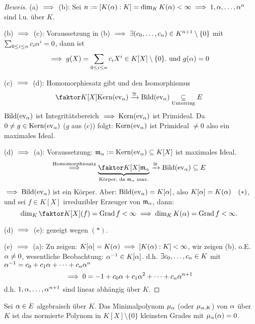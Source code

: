 \documentclass[a4paper]{report}
\begin{document}
\begin{proof}[Beweis]
  \item (a) $\implies$ (b):
  Sei $n := [K (\alpha) : K] = \dim_{K}K(\alpha) < \infty \implies 1, \alpha, \ldots, \alpha^{n}$ sind l.u. über $K$.
  \item (b) $\implies$ (c): Voraussetzung in (b) $\implies \exists(c_{0}, \ldots, c_{n}) \in K^{n+1} \setminus \{0\}$ mit \(\sum_{0 \le i \le n} c_{i}\alpha^{i} = 0\), dann ist
  \[\implies g(X) = \sum_{0 \le i \le n}c_{i}X^{i} \in K[X] \setminus \{0\}. \text{ und } g(\alpha) = 0\]
  \item (c) $\implies$ (d):
  Homomorphiesatz gibt und den Isomorphismus
  \[\fak{K[X]}{\ker(\ev_{\a})} \xrightarrow{\cong}\bil(\ev_{\a}) \underset{\text{Unterring}}\subseteq E\]
  $\operatorname{Bild}(\operatorname{ev}_{\alpha})$ ist Integritätsbereich $\implies \operatorname{Kern}(\operatorname{ev}_{\alpha})$ ist Primideal. Da $0 \ne g \in \operatorname{Kern}(\operatorname{ev}_{\alpha})$ ($g$ aus (c)) folgt: $\operatorname{Kern}(\operatorname{ev}_{\alpha})$ ist Primideal $\ne 0$ also ein maximales Ideal.
  \item (d) $\implies$ (a):
  Voraussetzung: $\mathfrak m_{\alpha}:= \operatorname{Kern}(\operatorname{ev}_\alpha) \subseteq K[X]$ ist maximales Ideal.
  \[\overset{\text{Homomorphiesatz}} \imp \ubr{\fak{K[X]}{\mathfrak m_{\a}}}_{\text{Körper, da }\mathfrak m_{\a} \text{ max.}} \xrightarrow{\cong} \bil(\ev_{\a})\subseteq E\]
  $\implies \operatorname{Bild}(\operatorname{ev}_{\alpha})$ ist ein Körper. Aber: $\operatorname{Bild}(\operatorname{ev}_{\alpha}) = K[\alpha]$, also $K[\alpha] = K(\alpha)\quad (*)$, und sei $f \in K[X]$ irreduzibler Erzeuger von $\mathfrak m_{\alpha}$, dann:
  \[\dim_{K} \fak{K[X]}{(f)} = \grad f < \infty \imp \dim_{K} K(\a) = \grad f < \infty.\]
  \item (d) $\implies$ (e): gezeigt wegen $(*)$.
  \item (e) $\implies$ (a): Zu zeigen: $K[\alpha] = K(\alpha) \implies [K(\alpha) : K] < \infty$, wir zeigen (b). o.E. $\alpha \ne 0$, wesentliche Beobachtung: $\alpha^{-1} \in K[\alpha]$. d.h. $\exists c_{0}, \ldots, c_{n} \in K$ mit $\alpha^{-1} = c_{0}+c_{1}\alpha + \cdots + c_{n}\alpha^{n}$
  \[\implies 0 = -1 + c_{0}\alpha+c_{1}\alpha^{2} + \cdots + c_{n}\alpha^{n+1}\]
  d.h. $1, \alpha, \ldots, \alpha^{n+1}$ sind linear abhängig über $K$.
\end{proof}

\begin{defi}
Sei $\alpha \in E$ algebraisch über $K$. Das Minimalpolynom $\mu_{\alpha}$ (oder $\mu_{\alpha, K}$) von $\alpha$ über $K$ ist das normierte Polynom in $K[X] \setminus \{0\}$ kleinsten Grades mit $\mu_{\alpha}(\alpha)= 0$.
\end{defi}
\end{document}
